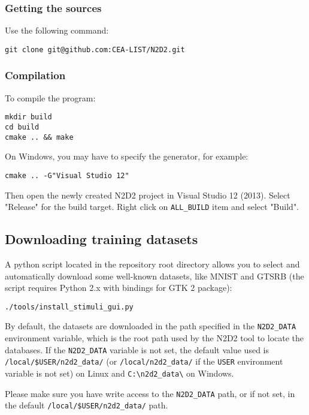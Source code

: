 \documentclass[a4paper,11pt,oneside]{article}
\begin{document}
\subsubsection{Getting the sources}

\noindent Use the following command:
\begin{lstlisting}
git clone git@github.com:CEA-LIST/N2D2.git
\end{lstlisting}

\subsubsection{Compilation}

\noindent To compile the program:
\begin{lstlisting}
mkdir build
cd build
cmake .. && make
\end{lstlisting}

On Windows, you may have to specify the generator, for example:
\begin{lstlisting}
cmake .. -G"Visual Studio 12"
\end{lstlisting}

Then open the newly created N2D2 project in Visual Studio 12 (2013). Select
"Release" for the build target. Right click on \lstinline!ALL_BUILD! item and
select "Build".


\subsection{Downloading training datasets}

A python script located in the repository root directory allows you to select and
 automatically download some well-known datasets, like MNIST and GTSRB
 (the script requires Python 2.x with bindings for GTK 2 package):
\begin{lstlisting}
./tools/install_stimuli_gui.py
\end{lstlisting}

By default, the datasets are downloaded in the path specified in the
 \lstinline!N2D2_DATA! environment variable, which is the root path used by the
 N2D2 tool to locate the databases. If the \lstinline!N2D2_DATA! variable is
  not set, the default value used is {\tt{}/local/\$USER/n2d2\_data/}
  (or {\tt{}/local/n2d2\_data/} if the \lstinline!USER! environment variable
   is not set) on Linux and {\tt{}C:\textbackslash{}n2d2\_data\textbackslash{}}
    on Windows.

Please make sure you have write access to the \lstinline!N2D2_DATA! path, or if
not set, in the default {\tt{}/local/\$USER/n2d2\_data/} path.
\end{document}
